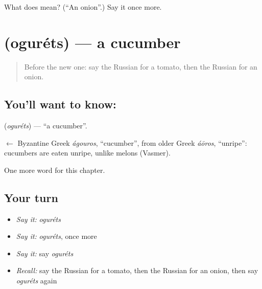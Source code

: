 \begin{tcolorbox}[breakable,colback=teal!4,colframe=teal!35!black,title={Before you move on}]
What does  mean? (\textquotedblleft{}An onion\textquotedblright{}.) Say it once more.
\end{tcolorbox}
\section[\texorpdfstring{\ru{огурец} (oguréts)}{огурец (oguréts)}]{ (oguréts) — a cucumber}

\label{lesson:RU-C45-cucumber}



\begin{quote}
Before the new one: say the Russian for a tomato, then the Russian for an onion.
\end{quote}

\subsection*{You'll want to know: }
\textbf{} (\emph{oguréts}) — \textquotedblleft{}a cucumber\textquotedblright{}.

\begin{cousinweb}
\textbf{} $\leftarrow$ Byzantine Greek \emph{ágouros}, \textquotedblleft{}cucumber\textquotedblright{}, from older Greek \emph{áōros}, \textquotedblleft{}unripe\textquotedblright{}: cucumbers are eaten unripe, unlike melons (Vasmer).
\end{cousinweb}

\begin{grammarlens}[title={What you've built}]
One more word for this chapter.
\end{grammarlens}

\subsection*{Your turn}
\begin{itemize}
\raggedright
  \item \emph{Say it:} \emph{oguréts}
  \item \emph{Say it:} \emph{oguréts}, once more
  \item \emph{Say it:} say \emph{oguréts}
  \item \emph{Recall:} say the Russian for a tomato, then the Russian for an onion, then say \emph{oguréts} again
\end{itemize}

